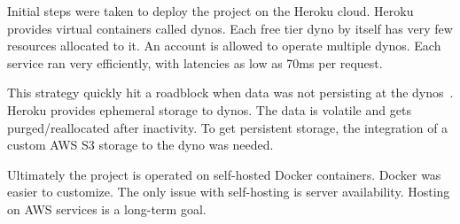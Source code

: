 Initial steps were taken to deploy the project on the Heroku cloud. Heroku provides virtual containers called dynos. Each free tier dyno by itself has very few resources allocated to it. An account is allowed to operate multiple dynos. Each service ran very efficiently, 
with latencies as low as 70ms per request.

This strategy quickly hit a roadblock when data was not persisting at the dynos~\cite{HerokuActiveStorage}. 
Heroku provides ephemeral storage to dynos. The data is volatile and gets purged/reallocated after inactivity.
To get persistent storage, the integration of a custom AWS S3 storage to the dyno was needed.

Ultimately the project is operated on self-hosted Docker containers. Docker was easier to customize. The only issue with self-hosting is server availability. Hosting on AWS services is a long-term goal.